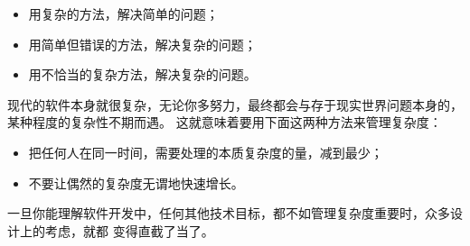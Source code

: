 \documentclass{article}
\begin{document}
\begin{itemize}
    \begin{itemize}
        \item 用复杂的方法，解决简单的问题；
        \item 用简单但错误的方法，解决复杂的问题；
        \item 用不恰当的复杂方法，解决复杂的问题。
    \end{itemize}
    现代的软件本身就很复杂，无论你多努力，最终都会与存于现实世界问题本身的，某种程度的复杂性不期而遇。
    这就意味着要用下面这两种方法来管理复杂度：
    \begin{itemize}
        \item 把任何人在同一时间，需要处理的本质复杂度的量，减到最少；
        \item 不要让偶然的复杂度无谓地快速增长。
    \end{itemize}
    一旦你能理解软件开发中，任何其他技术目标，都不如管理复杂度重要时，众多设计上的考虑，就都
    变得直截了当了。
\end{itemize}
\end{document}
